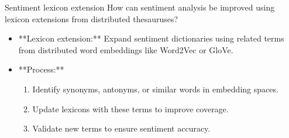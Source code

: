 \documentclass{article}
\begin{document}
\begin{exercise}{Sentiment lexicon extension}
  How can sentiment analysis be improved using lexicon extensions from distributed thesauruses?

  \begin{solution}
    \begin{itemize}
        \item **Lexicon extension:** Expand sentiment dictionaries using related terms from distributed word embeddings like Word2Vec or GloVe.
        \item **Process:**
        \begin{enumerate}
            \item Identify synonyms, antonyms, or similar words in embedding spaces.
            \item Update lexicons with these terms to improve coverage.
            \item Validate new terms to ensure sentiment accuracy.
        \end{enumerate}
    \end{itemize}
  \end{solution}
\end{exercise}
\end{document}
